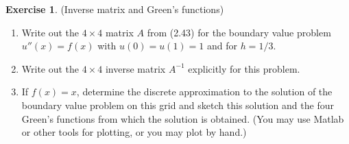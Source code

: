 \documentclass[12pt]{article}
\theoremstyle{definition}
\newtheorem{exer}{Exercise}
\theoremstyle{remark}
\begin{document}
\begin{exer}
 (Inverse matrix and Green's functions)
\begin{enumerate}
\item Write out the $4\times 4$
matrix $A$ from (2.43) for the boundary value problem
$u''(x)=f(x)$ with $u(0)=u(1)=1$ and for  $h = 1/3$.

\item Write out the $4\times 4$
inverse matrix $A^{-1}$ explicitly for this problem.

\item
If $f(x)=x$, determine the discrete approximation to the solution of the
boundary value problem on this grid and sketch this solution and the four
Green's functions from which the solution is obtained.  (You may use Matlab or
other tools for plotting, or you may plot by hand.)
\end{enumerate}
\end{exer}
\end{document}
